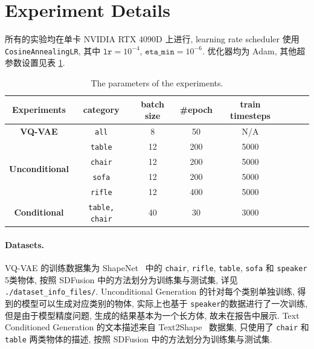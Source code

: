 \documentclass[11pt]{article}
\newcommand\1{\mathds{1}}
\begin{document}
\section{Experiment Details}
所有的实验均在单卡 NVIDIA RTX 4090D 上进行, learning rate scheduler 使用 \texttt{CosineAnnealingLR}, 其中 $\texttt{lr} = 10^{-4}$, $\texttt{eta\_min} = 10^{-6}$. 优化器均为 Adam, 
其他超参数设置见表 \cref{tab:params}.
\begin{table}[htbp]
    \centering
    \begin{tabular}{cccccccc}
        \toprule
        \textbf{Experiments}  &  \textbf{category} & \textbf{batch size} & \textbf{\#epoch} & \textbf{train timesteps}\\ 
        \midrule
        \textbf{VQ-VAE} & \texttt{all} & 8 &  50 & N/A \\
        \midrule
        \multirow{4}{*}{\textbf{Unconditional}}  & \texttt{table} & 12 & 200 & 5000 \\
        & \texttt{chair} & 12 & 200 & 5000 \\
        & \texttt{sofa} & 12 & 200 & 5000 \\
        & \texttt{rifle} & 12 & 400 & 5000\\
        \midrule
        \textbf{Conditional} & \texttt{table, chair} & 40 & 30 & 3000  \\
        \bottomrule
    \end{tabular}
    \caption{The parameters of the experiments. }
    \label{tab:params}
\end{table}

\paragraph{Datasets.} VQ-VAE 的训练数据集为 ShapeNet~\cite{shapenet} 中的 \texttt{chair}, \texttt{rifle}, \texttt{table}, \texttt{sofa} 和 \texttt{speaker} 5类物体, 按照 SDFusion 中的方法划分为训练集与测试集, 详见 \texttt{./dataset\_info\_files/}. 
Unconditional Generation 的针对每个类别单独训练, 得到的模型可以生成对应类别的物体, 实际上也基于 \texttt{speaker}的数据进行了一次训练, 但是由于模型精度问题, 生成的结果基本为一个长方体, 故未在报告中展示. Text Conditioned Generation 的文本描述来自 Text2Shape~\cite{chen2018text2shape} 数据集, 只使用了 \texttt{chair} 和 \texttt{table} 两类物体的描述, 按照 SDFusion 中的方法划分为训练集与测试集.
\end{document}

